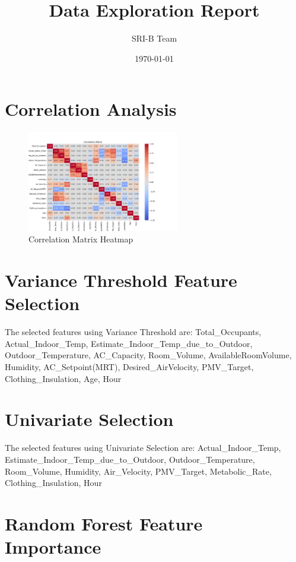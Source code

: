 \documentclass{article}%
\title{Data Exploration Report}%
\author{SRI{-}B Team}%
\date{\today}%
\begin{document}
%
\normalsize%
\maketitle%
\section{Correlation Analysis}%
\label{sec:CorrelationAnalysis}%

%


\begin{figure}[h!]%
\centering%
\includegraphics[width=250px]{correlation_matrix.png}%
\caption{Correlation Matrix Heatmap}%
\end{figure}

%
\section{Variance Threshold Feature Selection}%
\label{sec:VarianceThresholdFeatureSelection}%

%
The selected features using Variance Threshold are: Total\_Occupants, Actual\_Indoor\_Temp, Estimate\_Indoor\_Temp\_due\_to\_Outdoor, Outdoor\_Temperature, AC\_Capacity, Room\_Volume, AvailableRoomVolume, Humidity, AC\_Setpoint(MRT), Desired\_AirVelocity, PMV\_Target, Clothing\_Insulation, Age, Hour%
\section{Univariate Selection}%
\label{sec:UnivariateSelection}%

%
The selected features using Univariate Selection are: Actual\_Indoor\_Temp, Estimate\_Indoor\_Temp\_due\_to\_Outdoor, Outdoor\_Temperature, Room\_Volume, Humidity, Air\_Velocity, PMV\_Target, Metabolic\_Rate, Clothing\_Insulation, Hour%
\section{Random Forest Feature Importance}%
\label{sec:RandomForestFeatureImportance}%
\end{document}
